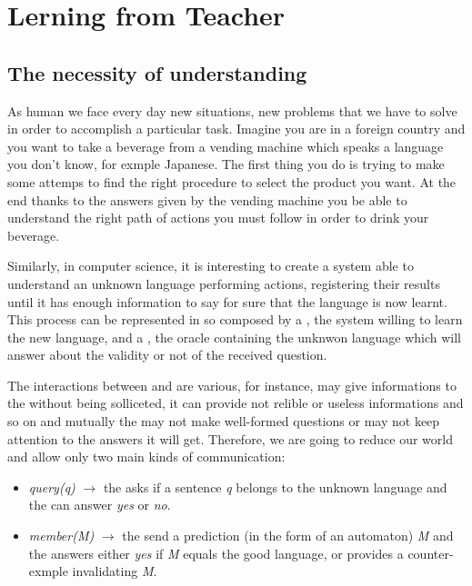 \section{Lerning from Teacher}

\subsection{The necessity of understanding}

As human we face every day new situations, new problems that we have to solve in order to accomplish a particular task.
Imagine you are in a foreign country and you want to take a beverage from a vending machine which speaks a language you don't know, for exmple Japanese. The first thing you do is trying to make some attemps to find the right procedure to select the product you want. At the end thanks to the answers given by the vending machine you be able to understand the right path of actions you must follow in order to drink your beverage.

Similarly, in computer science, it is interesting to create a system able to understand an unknown language performing actions, registering their results until it has enough information to say for sure that the language is now learnt. This process can be represented in so composed by a \lerner{}, the system willing to learn the new language, and a \teacher{}, the oracle containing the unknwon language which will answer about the validity or not of the received question.

The interactions between \lerner{} and \teacher{} are various, for instance, \teacher{} may give informations to the \lerner{} without being solliceted, it can provide not relible or useless informations and so on and mutually the \lerner{} may not make well-formed questions or may not keep attention to the answers it will get. Therefore, we are going to reduce our world and allow only two main kinds of communication:
\begin{itemize}
  \item \textit{query(q)} $\rightarrow$ the \lerner{} asks if a sentence \textit{q} belongs to the unknown language and the \teacher{} can answer \textit{yes} or \textit{no}.
  \item \textit{member(M)} $\rightarrow$ the \lerner{} send a prediction (in the form of an automaton) \textit{M} and the \teacher{} answers either \textit{yes} if \textit{M} equals the good language, or provides a counter-exmple invalidating \textit{M}.
\end{itemize}


